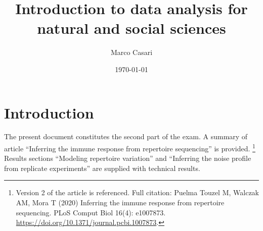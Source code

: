 \documentclass{article}
\title{Introduction to data analysis for natural and social sciences}
\author{Marco Casari}
\date{\today}
\begin{document}
\maketitle

\section{Introduction}
The present document constitutes the second part of the exam. A summary of article ``Inferring the immune response from repertoire sequencing'' is provided.%
\footnote{Version 2 of the article is referenced. Full citation: Puelma Touzel M, Walczak AM, Mora T (2020) Inferring the immune response from repertoire sequencing. PLoS Comput Biol 16(4): e1007873. \url{https://doi.org/10.1371/journal.pcbi.1007873}.}
Results sections ``Modeling repertoire variation'' and ``Inferring the noise profile from replicate experiments'' are supplied with technical results.
\end{document}
